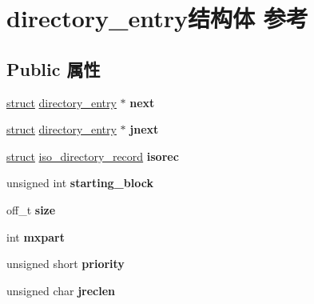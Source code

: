 \hypertarget{structdirectory__entry}{}\section{directory\+\_\+entry结构体 参考}
\label{structdirectory__entry}
\subsection*{Public 属性}
\begin{DoxyCompactItemize}
\item 
\mbox{\label{structdirectory__entry_a6a5c211eb5e6019ff2a41c652357b331}} 
\hyperlink{interfacestruct}{struct} \hyperlink{structdirectory__entry}{directory\+\_\+entry} $\ast$ {\bfseries next}
\item 
\mbox{\label{structdirectory__entry_afb71b6395f467180706205bde7049f4c}} 
\hyperlink{interfacestruct}{struct} \hyperlink{structdirectory__entry}{directory\+\_\+entry} $\ast$ {\bfseries jnext}
\item 
\mbox{\label{structdirectory__entry_a760f9c340b420d7d016ba5646bc7a260}} 
\hyperlink{interfacestruct}{struct} \hyperlink{structiso__directory__record}{iso\+\_\+directory\+\_\+record} {\bfseries isorec}
\item 
\mbox{\label{structdirectory__entry_a3ac12ce48ec67cd921dfb959a310c5bc}} 
unsigned int {\bfseries starting\+\_\+block}
\item 
\mbox{\label{structdirectory__entry_a47a77cbf821af8285cde77899896037c}} 
off\+\_\+t {\bfseries size}
\item 
\mbox{\label{structdirectory__entry_a66affb60136bdef5705043a47d15c639}} 
int {\bfseries mxpart}
\item 
\mbox{\label{structdirectory__entry_adad6ed0abd5a82f2e0d576bd03beb58d}} 
unsigned short {\bfseries priority}
\item 
\mbox{\label{structdirectory__entry_adbac0109c57dba0de46deff95d357d5c}} 
unsigned char {\bfseries jreclen}

\end{DoxyCompactItemize}
